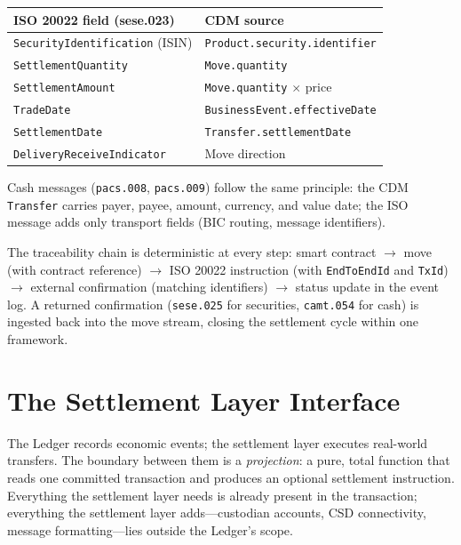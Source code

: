 \documentclass[11pt,a4paper]{article}
\begin{document}
\begin{center}
\begin{tabular}{l l}
\toprule
\textbf{ISO 20022 field (sese.023)} & \textbf{CDM source} \\
\midrule
\texttt{SecurityIdentification} (ISIN) & \texttt{Product.security.identifier} \\
\texttt{SettlementQuantity}            & \texttt{Move.quantity} \\
\texttt{SettlementAmount}              & \texttt{Move.quantity} $\times$ price \\
\texttt{TradeDate}                     & \texttt{BusinessEvent.effectiveDate} \\
\texttt{SettlementDate}                & \texttt{Transfer.settlementDate} \\
\texttt{DeliveryReceiveIndicator}      & Move direction \\
\bottomrule
\end{tabular}
\end{center}

Cash messages (\texttt{pacs.008}, \texttt{pacs.009}) follow the same principle: the CDM \texttt{Transfer} carries payer, payee, amount, currency, and value date; the ISO message adds only transport fields (BIC routing, message identifiers).

The traceability chain is deterministic at every step: smart contract $\to$ move (with contract reference) $\to$ ISO 20022 instruction (with \texttt{EndToEndId} and \texttt{TxId}) $\to$ external confirmation (matching identifiers) $\to$ status update in the event log. A returned confirmation (\texttt{sese.025} for securities, \texttt{camt.054} for cash) is ingested back into the move stream, closing the settlement cycle within one framework.


\section{The Settlement Layer Interface}
\label{sec:settlement}

The Ledger records economic events; the settlement layer executes real-world transfers. The boundary between them is a \emph{projection}: a pure, total function that reads one committed transaction and produces an optional settlement instruction. Everything the settlement layer needs is already present in the transaction; everything the settlement layer adds---custodian accounts, CSD connectivity, message formatting---lies outside the Ledger's scope.
\end{document}
